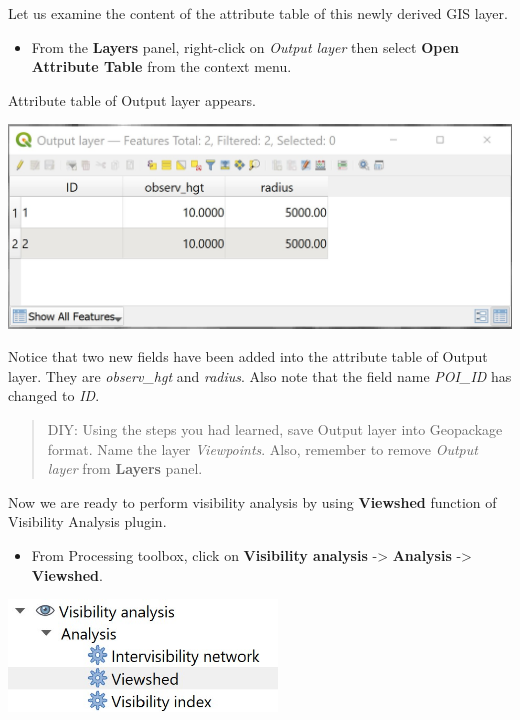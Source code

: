 \documentclass[
  letterpaper,
  DIV=11,
  numbers=noendperiod]{scrreprt}
\providecommand{\tightlist}{%
  \setlength{\itemsep}{0pt}\setlength{\parskip}{0pt}}\usepackage{longtable,booktabs,array}
\begin{document}
Let us examine the content of the attribute table of this newly derived
GIS layer.

\begin{itemize}
\tightlist
\item
  From the \textbf{Layers} panel, right-click on \emph{Output layer}
  then select \textbf{Open Attribute Table} from the context menu.
\end{itemize}

Attribute table of Output layer appears.

\includegraphics[width=12.86458in,height=\textheight]{./img06/image62.jpg}

Notice that two new fields have been added into the attribute table of
Output layer. They are \emph{observ\_hgt} and \emph{radius}. Also note
that the field name \emph{POI\_ID} has changed to \emph{ID}.

\begin{quote}
DIY: Using the steps you had learned, save Output layer into Geopackage
format. Name the layer \emph{Viewpoints}. Also, remember to remove
\emph{Output layer} from \textbf{Layers} panel.
\end{quote}

Now we are ready to perform visibility analysis by using
\textbf{Viewshed} function of Visibility Analysis plugin.

\begin{itemize}
\tightlist
\item
  From Processing toolbox, click on \textbf{Visibility analysis}
  -\textgreater{} \textbf{Analysis} -\textgreater{} \textbf{Viewshed}.
\end{itemize}

\includegraphics[width=2.8125in,height=\textheight]{./img06/image63.jpg}
\end{document}
